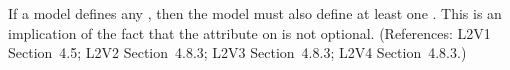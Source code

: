 If a model defines any \Species, then the model must also define at least
one \Compartment.  This is an implication of the fact that the
 attribute on \Species is not optional.  (References: L2V1
Section~4.5; L2V2 Section~4.8.3; L2V3 Section~4.8.3; L2V4 Section~4.8.3.)
